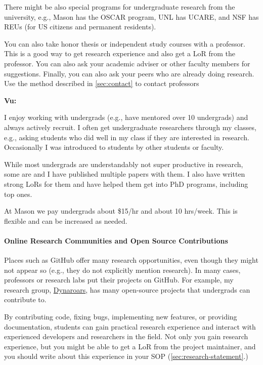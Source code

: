 \documentclass[oneside,11pt,dvipsnames]{book}
\newenvironment{commentbox}[1][]{
  \small
  \begin{mybox}
    {\small \textbf{#1}}
  }{
  \end{mybox}
}
\begin{document}
There might be also special programs for undergraduate research from the university, e.g., Mason has the OSCAR program, UNL has UCARE, and NSF has REUs (for US citizens and permanent residents).

You can also take honor thesis or independent study courses with a professor.  This is a good way to get research experience and also get a LoR from the professor.  You can also ask your academic adviser or other faculty members for suggestions.  Finally, you can also ask your peers who are already doing research.  Use the method described in \autoref{sec:contact} to contact professors


\begin{commentbox}[Vu:]
    I enjoy working with undergrads (e.g., have mentored over 10 undergrads) and always actively recruit.
    I often get undergraduate researchers through my classes, e.g., asking students who did well in my class if they are interested in research.  Occasionally I was introduced to students by other students or faculty.

    While most undergrads are understandably not super productive in research, some are and I have published multiple papers with them.  I also have written strong LoRs for them and have helped them get into PhD programs, including top ones.

    \tcblower
    At Mason we pay undergrads about \$15/hr and about 10 hrs/week. This is flexible and can be increased as needed.
\end{commentbox}

\paragraph{Online Research Communities and Open Source Contributions} Places such as GitHub offer many research opportunities, even though they might not appear so (e.g., they do not explicitly mention research).
In many cases, professors or research labs put their projects on GitHub. For example, my research group, \href{https://github.com/dynaroars/}{Dynaroars}, has many open-source projects that undergrads can contribute to.

By contributing code, fixing bugs, implementing new features, or providing documentation, students can gain practical research experience and interact with experienced developers and researchers in the field. Not only you gain research experience, but you might be able to get a LoR from the project maintainer, and you should write about this experience in your SOP (\autoref{sec:research-statement}.)
\end{document}
